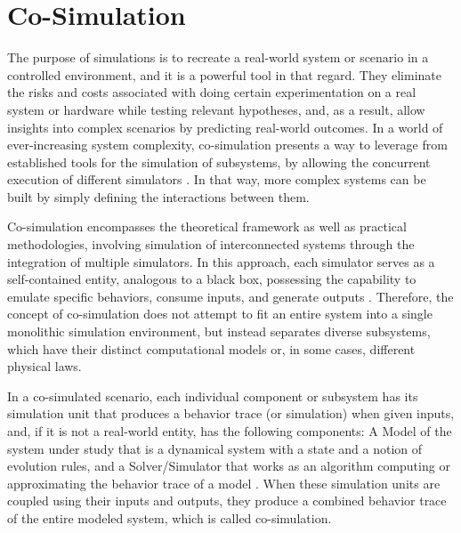 \section{Co-Simulation}
\label{co-simulation}
The purpose of simulations is to recreate a real-world system or scenario in a controlled environment, and it is a powerful tool in that regard. They eliminate the risks and costs associated with doing certain experimentation on a real system or hardware while testing relevant hypotheses, and, as a result, allow insights into complex scenarios by predicting real-world outcomes. In a world of ever-increasing system complexity, co-simulation presents a way to leverage from established tools for the simulation of subsystems, by allowing the concurrent execution of different simulators \cite{schweiger2019empirical}. In that way, more complex systems can be built by simply defining the interactions between them.

Co-simulation encompasses the theoretical framework as well as practical methodologies, involving simulation of interconnected systems through the integration of multiple simulators. In this approach, each simulator serves as a self-contained entity, analogous to a black box, possessing the capability to emulate specific behaviors, consume inputs, and generate outputs \cite{gomes2018co}. Therefore, the concept of co-simulation does not attempt to fit an entire system into a single monolithic simulation environment, but instead separates diverse subsystems, which have their distinct computational models or, in some cases, different physical laws.

In a co-simulated scenario, each individual component or subsystem has its simulation unit that produces a behavior trace (or simulation) when given inputs, and, if it is not a real-world entity, has the following components: A Model of the system under study that is a dynamical system with a state and a notion of evolution rules, and a Solver/Simulator that works as an algorithm computing or approximating the behavior trace of a model \cite{gomes2018co, schweiger2019empirical}. When these simulation units are coupled using their inputs and outputs, they produce a combined behavior trace of the entire modeled system, which is called co-simulation.

